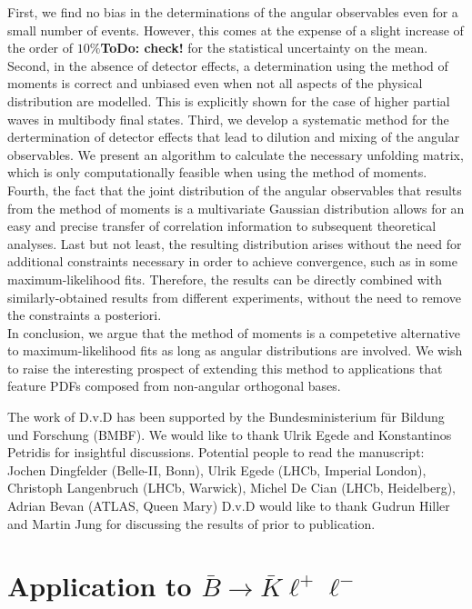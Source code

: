 \documentclass[aps,prd,reprint,nofootinbib,preprintnumbers]{revtex4}
\newcommand{\todo}[1]{{\color{red}\bf ToDo: #1}}
\newcommand{\danny}[1]{{\color{purple}#1}}
\begin{document}
First, we find no bias in the determinations of the angular observables even for a small number of events.
However, this comes at the expense of a slight increase of the order of $10\%$\todo{check!} for the statistical uncertainty
on the mean.
Second, in the absence of detector effects, a determination using the method of moments is correct and unbiased
even when not all aspects of the physical distribution are modelled. This is explicitly shown for the case of
higher partial waves in multibody final states.
Third, we develop a systematic method for the dertermination of detector effects that lead to
dilution and mixing of the angular observables. We present an algorithm to calculate the necessary
unfolding matrix, which is only computationally feasible when using the method of moments.
Fourth, the fact that the joint distribution of the angular observables that results from the method of moments
is a multivariate Gaussian distribution allows for an easy and precise transfer of correlation
information to subsequent theoretical analyses.
Last but not least, the resulting distribution arises without the need for additional constraints necessary
in order to achieve convergence, such as in some maximum-likelihood fits. Therefore, the results can be
directly combined with similarly-obtained results from different experiments, without the need to remove
the constraints a posteriori.\\

In conclusion, we argue that the method of moments is a competetive alternative to
maximum-likelihood fits as long as angular distributions are involved. We wish to raise
the interesting prospect of extending this method to applications that feature
PDFs composed from non-angular orthogonal bases.


\acknowledgments

The work of D.v.D has been supported by the Bundesministerium f\"ur Bildung und Forschung (BMBF).
We would like to thank Ulrik Egede and Konstantinos Petridis for insightful discussions.
\danny{Potential people to read the manuscript: Jochen Dingfelder (Belle-II, Bonn), Ulrik Egede (LHCb, Imperial London), Christoph Langenbruch (LHCb, Warwick), Michel De Cian (LHCb, Heidelberg), Adrian Bevan (ATLAS, Queen Mary)  }
D.v.D would like to thank Gudrun Hiller and Martin Jung for discussing the results of \cite{Das:2014sra} prior to publication.

\appendix

\section{Application to $\bar{B}\to\bar{K}\ell^+\ell^-$}
\label{app:btokll}
\end{document}
